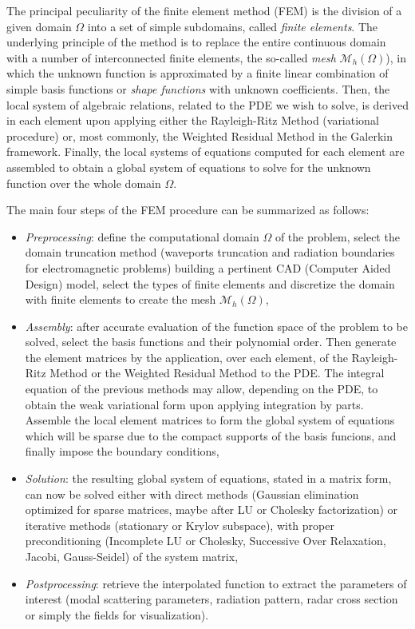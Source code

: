 The principal peculiarity of the finite element method (FEM) is the division of a given domain $\Omega$ into a set of simple subdomains, called \textit{finite elements}. The underlying principle of the method is to replace the entire continuous domain with a number of interconnected finite elements, the so-called \textit{mesh} $\mathcal{M}_h(\Omega)$), in which the unknown function is approximated by a finite linear combination of simple basis functions or \textit{shape functions} with unknown coefficients. Then, the local system of algebraic relations, related to the PDE we wish to solve, is derived in each element upon applying either the Rayleigh-Ritz Method (variational procedure) or, most commonly, the Weighted Residual Method in the Galerkin framework. Finally, the local systems of equations computed for each element are assembled to obtain a global system of equations to solve for the unknown function over the whole domain $\Omega$. 

The main four steps of the FEM procedure can be summarized as follows:
\begin{itemize}
\setlength{\itemsep}{0pt}
\item \textit{Preprocessing}: define the computational domain $\Omega$ of the problem, select the domain truncation method (waveports truncation and radiation boundaries for electromagnetic problems) building a pertinent CAD (Computer Aided Design) model, select the types of finite elements and discretize the domain with finite elements to create the mesh $\mathcal{M}_h(\Omega)$,
\item \textit{Assembly}: after accurate evaluation of the function space of the problem to be solved, select the basis functions and their polynomial order. Then generate the element matrices by the application, over each element, of the Rayleigh-Ritz Method or the Weighted Residual Method to the PDE. The integral equation of the previous methods may allow, depending on the PDE, to obtain the weak variational form upon applying integration by parts. Assemble the local element matrices to form the global system of equations which will be sparse due to the compact supports of the basis funcions, and finally impose the boundary conditions,
\item \textit{Solution}: the resulting global system of equations, stated in a matrix form, can now be solved either with direct methods (Gaussian elimination optimized for sparse matrices, maybe after LU or Cholesky factorization) or iterative methods (stationary or Krylov subspace), with proper preconditioning (Incomplete LU or Cholesky, Successive Over Relaxation, Jacobi, Gauss-Seidel) of the system matrix,
\item \textit{Postprocessing}: retrieve the interpolated function to extract the parameters of interest (modal scattering parameters, radiation pattern, radar cross section or simply the fields for visualization).
\end{itemize}

